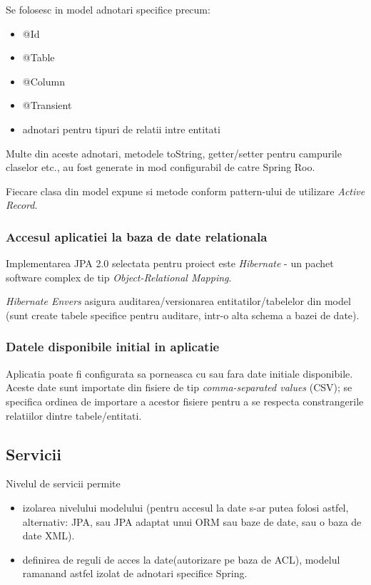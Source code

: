 Se folosesc in model adnotari specifice precum:
\begin{itemize}
  \item @Id
  \item @Table
  \item @Column
  \item @Transient
  \item adnotari pentru tipuri de relatii intre entitati %
\end{itemize}

Multe din aceste adnotari, metodele toString, 
getter/setter pentru campurile claselor etc., 
au fost generate in mod configurabil de catre Spring Roo.

Fiecare clasa din model expune si metode conform pattern-ului de utilizare \emph{Active Record}. 

\subsubsection{Accesul aplicatiei la baza de date relationala}
Implementarea JPA 2.0 selectata pentru proiect este \emph{Hibernate} - 
un pachet software complex de tip \emph{Object-Relational Mapping}.

\emph{Hibernate Envers} asigura auditarea/versionarea entitatilor/tabelelor din
model (sunt create tabele specifice pentru auditare, intr-o alta schema a bazei
de date).

\subsubsection{Datele disponibile initial in aplicatie}
Aplicatia poate fi configurata sa porneasca cu sau fara date initiale
disponibile.
Aceste date sunt importate din fisiere de tip \emph{comma-separated values} (CSV); 
se specifica ordinea de importare a acestor fisiere pentru a se respecta constrangerile relatiilor
dintre tabele/entitati.

\subsection{Servicii}
Nivelul de servicii permite 
\begin{itemize}
\item 
izolarea nivelului modelului (pentru accesul la
date s-ar putea folosi astfel, alternativ: JPA, sau JPA adaptat unui ORM sau
baze de date, sau o baza de date XML).
\item
definirea de reguli de acces la date(autorizare pe baza de ACL), modelul
ramanand astfel izolat de adnotari specifice Spring.
\end{itemize} 

